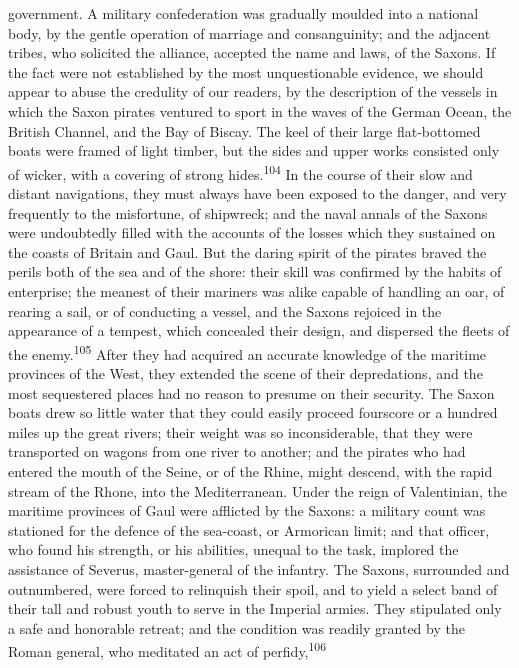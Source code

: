 government. A military confederation was gradually moulded into a
national body, by the gentle operation of marriage and
consanguinity; and the adjacent tribes, who solicited the
alliance, accepted the name and laws, of the Saxons. If the fact
were not established by the most unquestionable evidence, we
should appear to abuse the credulity of our readers, by the
description of the vessels in which the Saxon pirates ventured to
sport in the waves of the German Ocean, the British Channel, and
the Bay of Biscay. The keel of their large flat-bottomed boats
were framed of light timber, but the sides and upper works
consisted only of wicker, with a covering of strong hides.\textsuperscript{104} In
the course of their slow and distant navigations, they must
always have been exposed to the danger, and very frequently to
the misfortune, of shipwreck; and the naval annals of the Saxons
were undoubtedly filled with the accounts of the losses which
they sustained on the coasts of Britain and Gaul. But the daring
spirit of the pirates braved the perils both of the sea and of
the shore: their skill was confirmed by the habits of enterprise;
the meanest of their mariners was alike capable of handling an
oar, of rearing a sail, or of conducting a vessel, and the Saxons
rejoiced in the appearance of a tempest, which concealed their
design, and dispersed the fleets of the enemy.\textsuperscript{105} After they had
acquired an accurate knowledge of the maritime provinces of the
West, they extended the scene of their depredations, and the most
sequestered places had no reason to presume on their security.
The Saxon boats drew so little water that they could easily
proceed fourscore or a hundred miles up the great rivers; their
weight was so inconsiderable, that they were transported on
wagons from one river to another; and the pirates who had entered
the mouth of the Seine, or of the Rhine, might descend, with the
rapid stream of the Rhone, into the Mediterranean. Under the
reign of Valentinian, the maritime provinces of Gaul were
afflicted by the Saxons: a military count was stationed for the
defence of the sea-coast, or Armorican limit; and that officer,
who found his strength, or his abilities, unequal to the task,
implored the assistance of Severus, master-general of the
infantry. The Saxons, surrounded and outnumbered, were forced to
relinquish their spoil, and to yield a select band of their tall
and robust youth to serve in the Imperial armies. They stipulated
only a safe and honorable retreat; and the condition was readily
granted by the Roman general, who meditated an act of perfidy,\textsuperscript{106}
